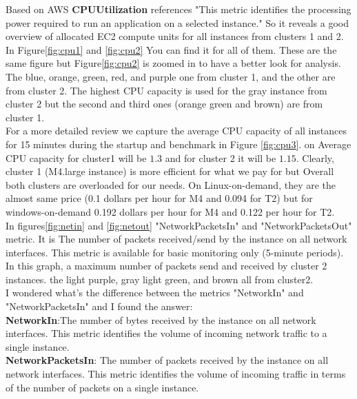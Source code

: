 \documentclass[12pt]{article}
\begin{document}
        Based on AWS \textbf{CPUUtilization} references "This metric identifies the processing power required to run an application on a selected instance." So it reveals a good overview of allocated EC2 compute units for all instances from clusters 1 and 2. In Figure\ref{fig:cpu1} and \ref{fig:cpu2} You can find it for all of them. These are the same figure but Figure\ref{fig:cpu2} is zoomed in to have a better look for analysis. \\
        The blue, orange, green, red, and purple one from cluster 1, and the other are from cluster 2. The highest CPU capacity is used for the gray instance from cluster 2 but the second and third ones (orange green and brown)  are from cluster 1.\\ For a more detailed review  we capture the average CPU capacity of all instances for 15 minutes during the startup and benchmark in Figure \ref{fig:cpu3}. on Average CPU capacity for cluster1 will be $1.3$ and for cluster 2 it will be $1.15$. Clearly, cluster 1 (M4.large instance) is more efficient for what we pay for but Overall both clusters are overloaded for our needs. On Linux-on-demand, they are the almost same price (0.1 dollars per hour for M4 and 0.094 for T2) but for windows-on-demand 0.192 dollars per  hour for M4 and 0.122 per hour for T2.\\
        In figures\ref{fig:netin} and \ref{fig:netout} "NetworkPacketsIn" and  "NetworkPacketsOut" metric. It is The number of packets received/send by the instance on all network interfaces. This metric is available for basic monitoring only (5-minute periods). In this graph, a maximum number of packets send and received by cluster 2 instances. the light purple, gray light green, and brown all from cluster2.\\
          I‌ wondered what's the difference between the metrics "NetworkIn"  and "NetworkPacketsIn" and I‌ found the answer:\\
         \textbf{NetworkIn}:‌The number of bytes received by the instance on all network interfaces. This metric identifies the volume of incoming network traffic to a single instance.\\
        \textbf{NetworkPacketsIn}: The number of packets received by the instance on all network interfaces. This metric identifies the volume of incoming traffic in terms of the number of packets on a single instance.\\
\end{document}
